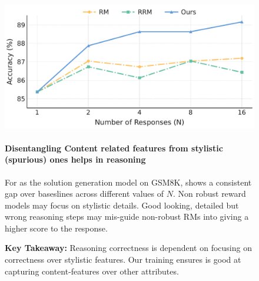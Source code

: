 \vspace{0.03in}
\begin{figure}[!ht]
  \centering
  \begin{minipage}[t]{0.48\textwidth}
  \vspace{0.0in}
    \centering
    \includegraphics[width=0.9\linewidth]{images/bon_gsm8k_gemma9b_pairpm.pdf}
    \label{fig:bon_gsm8k_gemma9b}
  \end{minipage}\hfill          %
  \begin{minipage}[t]{0.48\textwidth}
  \vspace{0.0in}
  \paragraph{Disentangling Content related features from stylistic (spurious) ones helps in reasoning}

For  as the solution generation model on GSM8K, \carma{} shows a consistent gap over baseslines across different values of $N$.
Non robust reward models may focus on stylistic details. Good looking, detailed but wrong reasoning steps may mis-guide non-robust RMs into giving a higher score to the response.
\end{minipage}

\vspace{0.03in}
\begin{takeawaybox}
\textbf{Key Takeaway:} Reasoning correctness is dependent on focusing on correctness over stylistic features. Our training ensures \carma{} is good at capturing content-features over other attributes. 
\end{takeawaybox}
\vspace{0.03in}
\end{figure}


\vspace{-0.22in}
